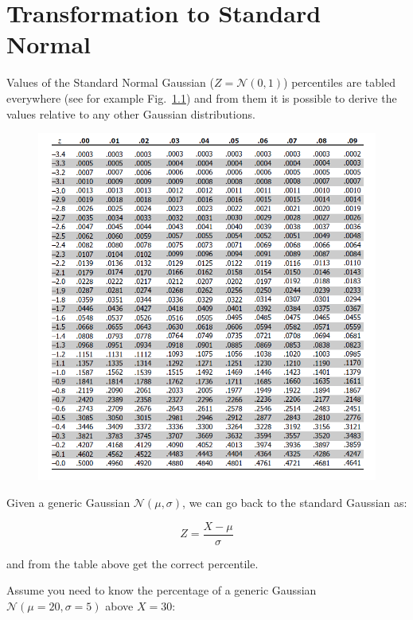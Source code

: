 \chapter{Transformation to Standard
  Normal}\label{transformation-to-standard-normal}

Values of the Standard Normal Gaussian (\(Z = \mathcal{N}(0,1)\))
percentiles are tabled everywhere (see for example Fig.~\ref{fig:normpercentile}) and from them it is possible to
derive the values relative to any other Gaussian distributions.

\begin{figure}[tb]
\centering
\includegraphics[width=1.\textwidth]{figures/norm_gauss_percentile}
\label{fig:normpercentile}
\end{figure}

Given a generic Gaussian \(\mathcal{N}(\mu , \sigma)\), we can go back
to the standard Gaussian as:

\begin{equation}Z= \frac{X-\mu}{\sigma}\end{equation}

and from the table above get the correct percentile.

Assume you need to know the percentage of a generic Gaussian
\(\mathcal{N}(\mu=20 ,\sigma=5)\) above \(X=30\):

